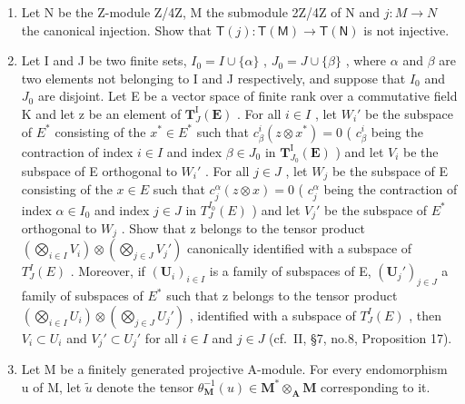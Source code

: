 \begin{enumerate}
\def\labelenumi{\arabic{enumi}.}
\item
  Let N be the Z-module Z/4Z, M the submodule 2Z/4Z of N and \(j:M\to N\) the canonical injection. Show that \(\mathsf{T}(j):\mathsf{T}(\mathsf{M})\to\mathsf{T}(\mathsf{N})\) is not injective.
\item
  Let I and J be two finite sets, \(I_{0} = I \cup \{\alpha\}\) , \(J_{0} = J \cup \{\beta\}\) , where \(\alpha\) and \(\beta\) are two elements not belonging to I and J respectively, and suppose that \(I_{0}\) and \(J_{0}\) are disjoint. Let E be a vector space of finite rank over a commutative field K and let z be an element of \(\mathbf{T}_{J}^{\mathrm{I}}(\mathbf{E})\) . For all \(i \in I\) , let \(W_{i}'\) be the subspace of \(E^{*}\) consisting of the \(x^{*} \in E^{*}\) such that \(c_{\beta}^{i}(z \otimes x^{*}) = 0\) ( \(c_{\beta}^{i}\) being the contraction of index \(i \in I\) and index \(\beta \in J_{0}\) in \(\mathbf{T}_{J_{0}}^{\mathrm{I}}(\mathbf{E})\) ) and let \(V_{i}\) be the subspace of E orthogonal to \(W_{i}'\) . For all \(j \in J\) , let \(W_{j}\) be the subspace of E consisting of the \(x \in E\) such that \(c_{j}^{\alpha}(z \otimes x) = 0\) ( \(c_{j}^{\alpha}\) being the contraction of index \(\alpha \in I_{0}\) and index \(j \in J\) in \(T_{J}^{I_{0}}(E)\) ) and let \(V_{j}'\) be the subspace of \(E^{*}\) orthogonal to \(W_{j}\) . Show that z belongs to the tensor product \(\left(\bigotimes_{i \in I} V_{i}\right) \otimes \left(\bigotimes_{j \in J} V_{j}'\right)\) canonically identified with a subspace of \(T_{J}^{I}(E)\) . Moreover, if \((\mathbf{U}_{i})_{i \in I}\) is a family of subspaces of E, \((\mathbf{U}_{j}')_{j \in J}\) a family of subspaces of \(E^{*}\) such that z belongs to the tensor product \(\left(\bigotimes_{i \in I} U_{i}\right) \otimes \left(\bigotimes_{j \in J} U_{j}'\right)\) , identified with a subspace of \(T_{J}^{I}(E)\) , then \(V_{i} \subset U_{i}\) and \(V_{j}' \subset U_{j}'\) for all \(i \in I\) and \(j \in J\) (cf.~II, §7, no.8, Proposition 17).
\item
  Let M be a finitely generated projective A-module. For every endomorphism u of M, let \(\tilde{u}\) denote the tensor \(\theta_{\mathbf{M}}^{-1}(u) \in \mathbf{M}^{*} \otimes_{\mathbf{A}} \mathbf{M}\) corresponding to it.
\end{enumerate}

